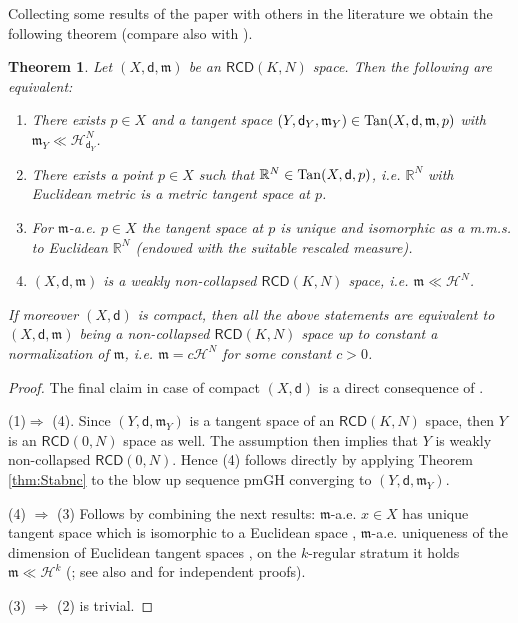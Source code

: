 \documentclass[a4paper]{amsart}
\newcounter{assu}
\theoremstyle{plain}
\newtheorem{theorem}[lemma]{Theorem}
\theoremstyle{definition}
\numberwithin{equation}{section}
\newcommand{\R}{\mathbb{R}}
\newcommand{\RCD}{\mathsf{RCD}}
\newcommand{\mm}{\mathfrak m}
\newcommand{\Tan}{{\rm Tan}}
\newcommand{\sfd}{\mathsf d}
\newcommand{\cH}{\mathcal{H}}
\begin{document}
{{{Collecting some results of the paper with others in the literature we obtain the following theorem { (compare also with \cite{GDPNonColl, KitaPOTA, AHPT}).}

\begin{theorem}\label{noncol-equiv}
Let $(X,\sfd,\mm)$ be an $\RCD(K,N)$ space. Then the following are equivalent:
\begin{enumerate}
\item There exists   $p \in X$ and a tangent space $(Y,\sfd_{Y},\mm_{Y})\in \Tan(X,\sfd,\mm, p)$ with $\mm_{Y}\ll \cH^{N}_{\sfd_{Y}}$.
\item There exists a point $p\in X$ such that $\R^{N}\in \Tan(X,\sfd,p)$, i.e. $\R^{N}$ with Euclidean metric is a metric tangent space at $p$.
\item For $\mm$-a.e. $p\in X$ the tangent space at $p$ is unique and isomorphic as a m.m.s. to Euclidean $\R^{N}$ (endowed with the suitable rescaled measure).
\item   $(X,\sfd,\mm)$ is a weakly  non-collapsed $\RCD(K,N)$ space, i.e. $\mm\ll \cH^{N}$.
\end{enumerate}
If moreover $(X,\sfd)$ is compact, then all the above statements are equivalent to  $(X,\sfd,\mm)$ being a non-collapsed $\RCD(K,N)$ space up to constant a normalization of $\mm$, i.e. $\mm=c \cH^{N}$ for some constant $c>0$.
\end{theorem}


\begin{proof}
The final claim in case of compact  $(X,\sfd)$ is a direct consequence of \cite{HondaNC}.
\medskip

(1)$ \Rightarrow$ (4). Since $(Y,\sfd, \mm_{Y})$ is a tangent space of an $\RCD(K,N)$ space, then $Y$ is an $\RCD(0,N)$ space as well. The assumption then implies that $Y$ is  weakly non-collapsed $\RCD(0,N)$. Hence (4)  follows directly by applying Theorem \ref {thm:Stabnc} to the blow up sequence pmGH converging to  $(Y,\sfd, \mm_{Y})$.
\medskip



(4) $\Rightarrow$ (3) Follows by combining the next results:  $\mm$-a.e. $x\in X$ has unique tangent space which is isomorphic to a Euclidean space \cite{MN},  $\mm$-a.e. uniqueness of the dimension of Euclidean tangent spaces \cite{BS18},  on the $k$-regular stratum  it holds $\mm\ll \cH^{k}$ (\cite[Theorem 1.2]{KM};  see also \cite{DePRinMar} and \cite{GiPa} for independent proofs).  
\medskip

(3) $\Rightarrow$ (2) is trivial.
\medskip 


\end{proof}}}}
\end{document}
